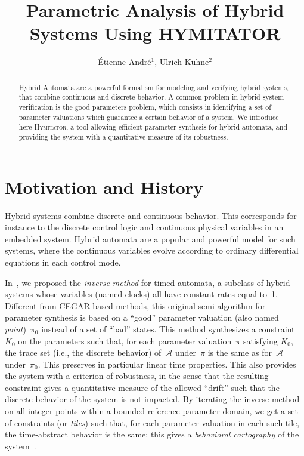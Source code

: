 \documentclass{llncs}
\title{Parametric Analysis of Hybrid Systems Using HYMITATOR}
\author{\'Etienne Andr\'e$^1$, %
	Ulrich K\"uhne$^2$%
	}
\institute{$^1$LIPN, CNRS UMR 7030, Université Paris 13, France \\
$^2$Universit\"at Bremen, Germany}
\newcommand{\A}{\mathcal{A}}
\newcommand{\Ko}{K_0}
\newcommand{\pio}{\pi_0}
\newcommand{\piprime}{\pi}
\newcommand{\hymitator}{\textsc{Hymitator}}
\newcommand{\commentaire}[1]{}
\begin{document}
\maketitle

\begin{abstract}
	Hybrid Automata are a powerful formalism for modeling and verifying hybrid systems, that combine continuous and discrete behavior.
	A common problem in hybrid system verification is the good parameters problem, which consists in identifying a set of parameter valuations which guarantee a certain behavior of a system.
	We introduce here \hymitator{}, a tool allowing efficient parameter synthesis for hybrid automata, and providing the system with a quantitative measure of its robustness.
\end{abstract}


\commentaire{Version avec commentaires}


\section{Motivation and History}


Hybrid systems combine discrete and continuous behavior.
This corresponds for instance to the discrete control logic and continuous physical variables in an embedded system.
Hybrid automata are a popular and powerful model for such systems, where the continuous variables evolve according to ordinary differential equations in each control mode.

In~\cite{acef09}, we proposed the \emph{inverse method} for timed automata, a subclass of hybrid systems whose variables (named clocks) all have constant rates equal to~1.
Different from CEGAR-based methods, this original semi-algorithm for parameter synthesis is based on a ``good'' parameter valuation (also named \emph{point})~$\pio$ instead of a set of ``bad'' states.
This method synthesizes a constraint~$\Ko$ on the parameters such that, for each parameter valuation~$\piprime$ satisfying $\Ko$, the trace set (i.e., the discrete behavior) of~$\A$ under~$\piprime$ is the same as for~$\A$ under~$\pio$.
This preserves in particular linear time properties.
This also provides the system with a criterion of robustness, in the sense that the resulting constraint gives a quantitative measure of the allowed ``drift'' such that the discrete behavior of the system is not impacted.
By iterating the inverse method on all integer points within a bounded reference parameter domain, we get a set of constraints (or \emph{tiles}) such that, for each parameter valuation in each such tile, the time-abstract behavior is the same: this gives a \emph{behavioral cartography} of the system~\cite{af10}.
\end{document}
